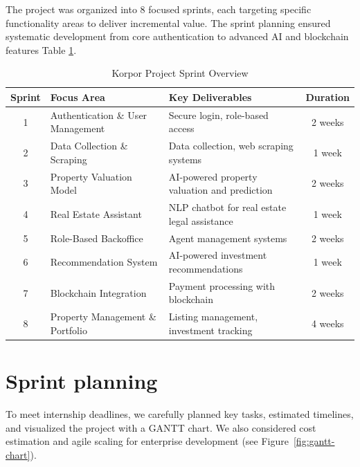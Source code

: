 The project was organized into 8 focused sprints, each targeting specific functionality areas to deliver incremental value. The sprint planning ensured systematic development from core authentication to advanced AI and blockchain features Table \ref{tab:sprint-overview}.

\newpage
\begin{table}[ht!]
\centering
\caption{Korpor Project Sprint Overview\label{tab:sprint-overview}}
\begin{tabular}{|c|l|p{6cm}|c|}
\hline
\textbf{Sprint} & \textbf{Focus Area} & \textbf{Key Deliverables} & \textbf{Duration} \\
\hline
1 & Authentication \& User Management & Secure login, role-based access & 2 weeks \\
\hline
2 & Data Collection \& Scraping & Data collection, web scraping systems & 1 week \\
\hline
3 & Property Valuation Model & AI-powered property valuation and prediction & 2 weeks \\
\hline
4 & Real Estate Assistant & NLP chatbot for real estate legal assistance & 1 week \\
\hline
5 & Role-Based Backoffice & Agent management systems & 2 weeks \\
\hline
6 & Recommendation System & AI-powered investment recommendations & 1 week \\
\hline
7 & Blockchain Integration & Payment processing with blockchain & 2 weeks \\
\hline
8 & Property Management \& Portfolio & Listing management, investment tracking & 4 weeks \\
\hline
\end{tabular}
\end{table}

\section{Sprint planning}

To meet internship deadlines, we carefully planned key tasks, estimated timelines, and visualized the project with a GANTT chart. We also considered cost estimation and agile scaling for enterprise development (see Figure~\ref{fig:gantt-chart}).

